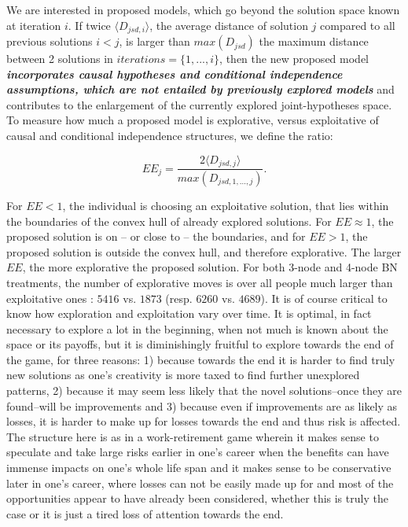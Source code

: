 We are interested in proposed models, which go beyond the solution space known at iteration $i$. If twice $\langle D_{jsd,i} \rangle$, the average distance of solution $j$ compared to all previous solutions $i < j$, is larger than $ max(D_{jsd})$ the maximum distance between 2 solutions in $iterations = \{1,...,i\}$, then the new proposed model {\it {\bf incorporates causal hypotheses and conditional independence assumptions, which are not entailed by previously explored models}} and contributes to the enlargement of the currently explored joint-hypotheses space. To measure how much a proposed model is explorative, versus exploitative of causal and conditional independence structures, we define the ratio:

\begin{equation}
EE_{j} = \frac{2 \langle D_{jsd,j} \rangle}{max(D_{jsd,1,...,j})}.
\end{equation}

For $EE < 1$, the individual is choosing an exploitative solution, that lies within the boundaries of the convex hull of already explored solutions. For $EE \approx 1$, the proposed solution is on -- or close to -- the boundaries, and for $EE > 1$, the proposed solution is outside the convex hull, and therefore explorative. The larger $EE$, the more explorative the proposed solution. For both 3-node and 4-node BN treatments,  the number of explorative moves is over all people much larger than exploitative ones :  $5416$ vs. $1873$ (resp. $6260$ vs. $4689$). It is of course critical to know how exploration and exploitation vary over time. It is optimal, in fact necessary to explore a lot in the beginning, when not much is known about the space or its payoffs, but it is diminishingly fruitful to explore towards the end of the game, for three reasons: 1) because towards the end it is harder to find truly new solutions as one's creativity is more taxed to find further unexplored patterns, 2) because it may seem less likely that the novel solutions--once they are found--will be improvements and 3) because even if improvements are as likely as losses, it is harder to make up for losses towards the end and thus risk is affected. The structure here is as in a work-retirement game wherein it makes sense to speculate and take large risks earlier in one's career when the benefits can have immense impacts on one's whole life span and it makes sense to be conservative later in one's career, where losses can not be easily made up for and most of the opportunities appear to have already been considered, whether this is truly the case or it is just a tired loss of attention towards the end.    

